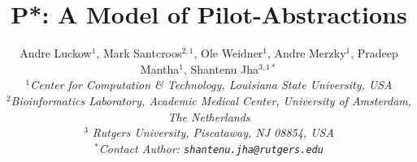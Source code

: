 \documentclass[conference]{IEEEtran}
\begin{document}

\title{P*: A Model of Pilot-Abstractions}

\author{
  Andre Luckow$^{1}$, Mark Santcroos$^{2,1}$, Ole Weidner$^{1}$, Andre Merzky$^{1}$, Pradeep Mantha$^{1}$, Shantenu Jha$^{3,1*}$\\[0.5em]
  \small{\emph{$^{1}$Center for Computation \& Technology, Louisiana State University, USA}}\\[-0.3em]
  \small{\emph{$^{2}$Bioinformatics Laboratory, Academic Medical Center, University of Amsterdam, The Netherlands}}\\[-0.3em]
  \small{\emph{$^{3}$ Rutgers University, Piscataway, NJ 08854, USA}}\\[-0.3em]
  \small{\emph{$^{*}$Contact Author: \texttt{shantenu.jha@rutgers.edu}}}\\[-0.3em]
  \up}

\date{}

\maketitle
\end{document}
